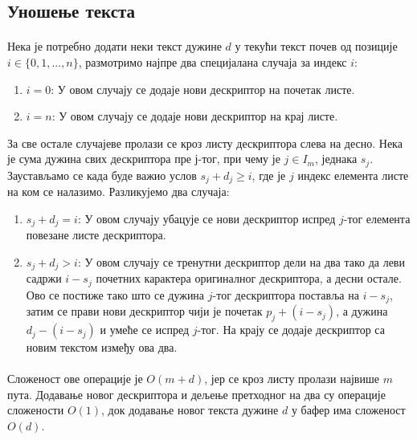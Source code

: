 \documentclass[12pt,oneside]{memoir}
\begin{document}
\subsection{Уношење текста}
\paragraph{}
Нека је потребно додати неки текст дужине \(d\) у текући текст почев од позиције
\(i \in \{0,1,...,n\}\), размотримо најпре два специјалана случаја за индекс \(i\):

\begin{enumerate}
	\item \(i=0\): У овом случају се додаје нови дескриптор на почетак листе.
	\item \(i=n\): У овом случају се додаје нови дескриптор на крај листе.
\end{enumerate}

За све остале случајеве пролази се кроз листу дескриптора слева на десно. 
Нека је сума дужина свих дескриптора пре \(ј\)-тог, при чему је \(j \in I_m\), једнака \(s_j\). Заустављамо се када буде важио услов \(s_j + d_j \geq i\), где је \(j\) индекс
елемента листе на ком се налазимо. Разликујемо два случаја:

\begin{enumerate}
	\item \(s_j + d_j = i\): У овом случају убацује се нови дескриптор испред \(j\)-тог
	елемента повезане листе дескриптора.
	\item \(s_j + d_j > i\): У овом случају се тренутни дескриптор дели на два тако
	да леви садржи \(i - s_j\) почетних карактера оригиналног дескриптора, а десни остале.
	Ово се постиже тако што се дужина \(j\)-тог дескриптора поставља на \(i - s_j\), затим
	се прави нови дескриптор чији је почетак \(p_j + (i - s_j)\), а дужина \(d_j - (i - s_j)\)
	и умеће се испред \(j\)-тог. На крају се додаје дескриптор са новим текстом између ова
	два.
	
\end{enumerate}

\paragraph{}
Сложеност ове операције је \(O(m + d)\), јер се кроз листу пролази највише \(m\) пута.
Додавање новог дескриптора и дељење претходног на два су операције сложености \(O(1)\), док
додавање новог текста дужине \(d\) у бафер има сложеност \(O(d)\).
\end{document}
